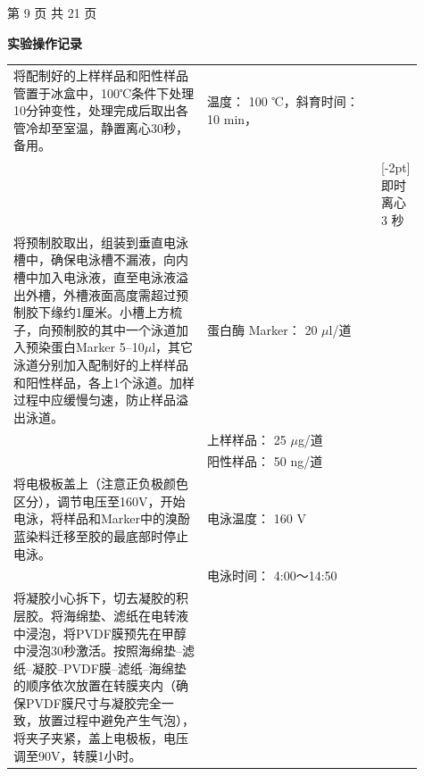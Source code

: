 \documentclass[UTF8,10pt,a4paper,fontset=fandol]{ctexart}
\newcommand{\fieldvalue}[1]{#1}
\newcommand{\handwritten}[1]{#1}
\begin{document}
\begin{center}
第 9 页 共 21 页
\end{center}

\newpage

\begin{center}
\textbf{实验操作记录}
\end{center}

\begin{tabular}{|p{0.48\linewidth}|p{0.43\linewidth}|}
\hline
将配制好的上样样品和阳性样品管置于冰盒中，100℃条件下处理10分钟变性，处理完成后取出各管冷却至室温，静置离心30秒，备用。
&
温度：
\fieldvalue{\handwritten{100}} ℃，斜育时间：
\fieldvalue{\handwritten{10}} min，\\
&&[-2pt]
即时离心
\fieldvalue{\handwritten{3}} 秒
\\
\hline
将预制胶取出，组装到垂直电泳槽中，确保电泳槽不漏液，向内槽中加入电泳液，直至电泳液溢出外槽，外槽液面高度需超过预制胶下缘约1厘米。小槽上方梳子，向预制胶的其中一个泳道加入预染蛋白Marker 5--10$\mu$l，其它泳道分别加入配制好的上样样品和阳性样品，各上1个泳道。加样过程中应缓慢匀速，防止样品溢出泳道。
&
蛋白酶 Marker：
\fieldvalue{\handwritten{20}} $\mu$l/道\\
&
上样样品：
\fieldvalue{\handwritten{25}} $\mu$g/道\\
&
阳性样品：
\fieldvalue{\handwritten{50}} ng/道
\\
\hline
将电极板盖上（注意正负极颜色区分），调节电压至160V，开始电泳，将样品和Marker中的溴酚蓝染料迁移至胶的最底部时停止电泳。
&
电泳温度：
\fieldvalue{\handwritten{160}} V\\
&
电泳时间：
\fieldvalue{\handwritten{4:00～14:50}}
\\
\hline
将凝胶小心拆下，切去凝胶的积层胶。将海绵垫、滤纸在电转液中浸泡，将PVDF膜预先在甲醇中浸泡30秒激活。按照海绵垫--滤纸--凝胶--PVDF膜--滤纸--海绵垫的顺序依次放置在转膜夹内（确保PVDF膜尺寸与凝胶完全一致，放置过程中避免产生气泡），将夹子夹紧，盖上电极板，电压调至90V，转膜1小时。

\end{tabular}
\end{document}
